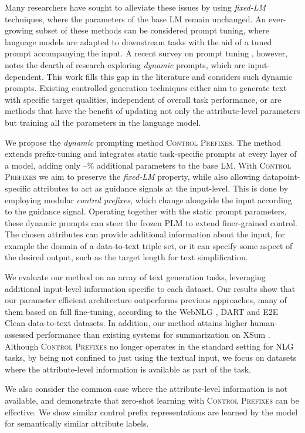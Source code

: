 \documentclass[11pt]{article}
\newcommand{\control}{\textsc{Control Prefixes}\xspace}
\begin{document}
Many researchers have sought to alleviate these issues by using \emph{fixed-LM} techniques, where the parameters of the base LM remain unchanged. An ever-growing subset of these methods can be considered prompt tuning, where language models are adapted to downstream tasks with the aid of a tuned prompt accompanying the input. A recent survey on prompt tuning \citep{prompt_survey}, however, notes the dearth of research exploring \emph{dynamic} prompts, which are input-dependent. This work fills this gap in the literature and considers such dynamic prompts. Existing controlled generation techniques either aim to generate text with specific target qualities, independent of overall task performance, or are methods that have the benefit of updating not only the attribute-level parameters but training all the parameters in the language model. 

We propose the \textit{dynamic} prompting method \control. The method extends prefix-tuning and integrates static task-specific prompts at every layer of a model, adding only –\% additional parameters to the base LM. With \control we aim to preserve the \emph{fixed-LM} property, while also allowing datapoint-specific attributes to act as guidance signals at the input-level. This is done by employing modular \emph{control prefixes}, which change alongside the input according to the guidance signal. Operating together with the static prompt parameters, these dynamic prompts can steer the frozen PLM to extend finer-grained control. The chosen attributes can provide additional information about the input, for example the domain of a data-to-text triple set, or it can specify some aspect of the desired output, such as the target length for text simplification. 

We evaluate our method on an array of text generation tasks, leveraging additional input-level information specific to each dataset. Our results show that our parameter efficient architecture outperforms previous approaches, many of them based on full fine-tuning, according to the WebNLG \citep{webnlg-2017}, DART \citep{dart} and E2E Clean \cite{E2Eclean} data-to-text datasets. In addition, our method attains higher human-assessed performance than existing systems for summarization on XSum \citep{xsum}. Although \control no longer operates in the standard setting for NLG tasks, by being not confined to just using the textual input, we focus on datasets where the attribute-level information is available as part of the task.

We also consider the common case where the attribute-level information is not available, and demonstrate that zero-shot learning with \control can be effective. We show similar control prefix representations are learned by the model for semantically similar attribute labels.
\end{document}
